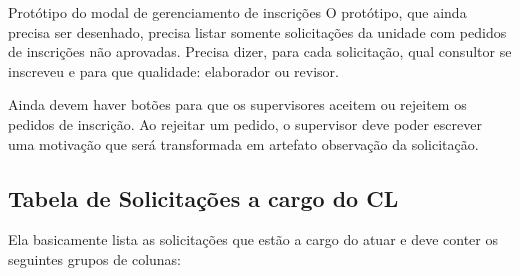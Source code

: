 \begin{nota}{Protótipo do modal de gerenciamento de inscrições}
	O protótipo, que ainda precisa ser desenhado, precisa listar somente solicitações da unidade com pedidos de inscrições não aprovadas. Precisa dizer, para cada solicitação, qual consultor se inscreveu e para que qualidade: elaborador ou revisor.
	
	Ainda devem haver botões para que os supervisores aceitem ou rejeitem os pedidos de inscrição. Ao rejeitar um pedido, o supervisor deve poder escrever uma motivação que será transformada em artefato observação da solicitação.
\end{nota}




\subsection{Tabela de Solicitações a cargo do CL} 	

Ela basicamente lista as solicitações que estão a cargo do \CL atuar e deve conter os seguintes grupos de colunas:

